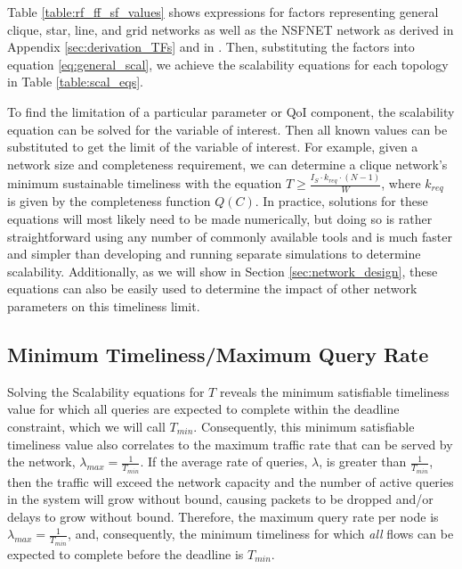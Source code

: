 Table \ref{table:rf_ff_sf_values} shows expressions for factors representing general clique, star, line, and grid networks as well as the NSFNET network as derived in Appendix \ref{sec:derivation_TFs} and in \cite{symptotics_journal}. Then, substituting the factors into equation \ref{eq:general_scal}, we achieve the scalability equations for each topology in Table \ref{table:scal_eqs}.  


To find the limitation of a particular parameter or QoI component, the scalability equation can be solved for the variable of interest.  Then all known values can be substituted to get the limit of the variable of interest.  For example, given a network size and completeness requirement, we can determine a clique network's minimum sustainable timeliness with the equation $T  \geq \frac{I_S \cdot k_{req} \cdot (N-1)}{W}$, where $k_{req}$ is given by the completeness function $Q(C)$.  In practice, solutions for these equations will most likely need to be made numerically, but doing so is rather straightforward using any number of commonly available tools and is much faster and simpler than developing and running separate simulations to determine scalability.  Additionally, as we will show in Section \ref{sec:network_design}, these equations can also be easily used to determine the impact of other network parameters on this timeliness limit. 

\subsection{Minimum Timeliness/Maximum Query Rate}

Solving the Scalability equations for $T$ reveals the minimum satisfiable timeliness value for which all queries are expected to complete within the deadline constraint, which we will call $T_{min}$.  Consequently, this minimum satisfiable timeliness value also correlates to the maximum traffic rate that can be served by the network, $\lambda_{max} = \frac{1}{T_{min}}$.  If the average rate of queries, $\lambda$, is greater than $\frac{1}{T_{min}}$, then the traffic will exceed the network capacity and the number of active queries in the system will grow without bound, causing packets to be dropped and/or delays to grow without bound.  Therefore, the maximum query rate per node is $\lambda_{max} = \frac{1}{T_{min}}$, and, consequently, the minimum timeliness for which \emph{all} flows can be expected to complete before the deadline is $T_{min}$.


